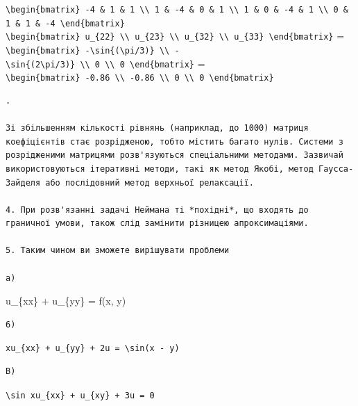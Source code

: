 \documentclass[
  ukrainian,
]{article}
\begin{document}
\texttt{\textbackslash{}begin\{bmatrix\}\ -4\ \&\ 1\ \&\ 1\ \textbackslash{}\textbackslash{}\ 1\ \&\ -4\ \&\ 0\ \&\ 1\ \textbackslash{}\textbackslash{}\ 1\ \&\ 0\ \&\ -4\ \&\ 1\ \textbackslash{}\textbackslash{}\ 0\ \&\ 1\ \&\ 1\ \&\ -4\ \textbackslash{}end\{bmatrix\}}
\texttt{\textbackslash{}begin\{bmatrix\}\ u\_\{22\}\ \textbackslash{}\textbackslash{}\ u\_\{23\}\ \textbackslash{}\textbackslash{}\ u\_\{32\}\ \textbackslash{}\textbackslash{}\ u\_\{33\}\ \textbackslash{}end\{bmatrix\}}
=
\texttt{\textbackslash{}begin\{bmatrix\}\ -\textbackslash{}sin\{(\textbackslash{}pi/3)\}\ \textbackslash{}\textbackslash{}\ -\textbackslash{}sin\{(2\textbackslash{}pi/3)\}\ \textbackslash{}\textbackslash{}\ 0\ \textbackslash{}\textbackslash{}\ 0\ \textbackslash{}end\{bmatrix\}}
=
\texttt{\textbackslash{}begin\{bmatrix\}\ -0.86\ \textbackslash{}\textbackslash{}\ -0.86\ \textbackslash{}\textbackslash{}\ 0\ \textbackslash{}\textbackslash{}\ 0\ \textbackslash{}end\{bmatrix\}}

\begin{verbatim}
.

Зі збільшенням кількості рівнянь (наприклад, до 1000) матриця коефіцієнтів стає розрідженою, тобто містить багато нулів. Системи з розрідженими матрицями розв'язуються спеціальними методами. Зазвичай використовуються ітеративні методи, такі як метод Якобі, метод Гаусса-Зайделя або послідовний метод верхньої релаксації.

4. При розв'язанні задачі Неймана ті *похідні*, що входять до граничної умови, також слід замінити різницею апроксимаціями.

5. Таким чином ви зможете вирішувати проблеми

a)
\end{verbatim}

u\_\{xx\} + u\_\{yy\} = f(x, y)

\begin{verbatim}
6)
\end{verbatim}

\texttt{xu\_\{xx\}\ +\ u\_\{yy\}\ +\ 2u\ =\ \textbackslash{}sin(x\ -\ y)}

\begin{verbatim}
B)
\end{verbatim}

\texttt{\textbackslash{}sin\ xu\_\{xx\}\ +\ u\_\{xy\}\ +\ 3u\ =\ 0}
\end{document}
